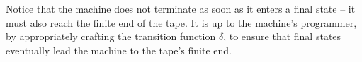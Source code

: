 Notice that the machine does not terminate as soon as it enters a final state -- it must also reach the finite end of the tape.
It is up to the machine's programmer, by appropriately crafting the transition function $\delta$, to ensure that final states eventually lead the machine to the tape's finite end.



